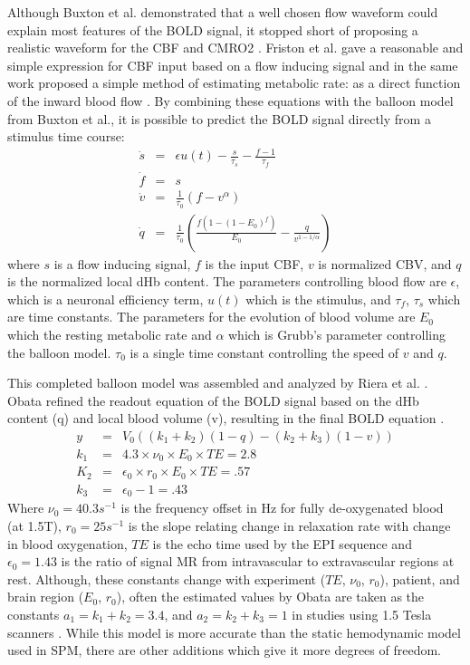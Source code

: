 Although Buxton et al. demonstrated that a well chosen flow waveform could 
explain most features of the \ac{BOLD} signal, it stopped short of proposing a
realistic waveform for the \ac{CBF} and \ac{CMRO2} \cite{Buxton1998}. Friston et al. 
gave a reasonable and simple
expression for \ac{CBF} input based on a flow inducing signal
and in the same work proposed a simple method
of estimating metabolic rate: as a direct function of the inward blood flow \cite{Friston2000}.
By combining these equations with the balloon model from Buxton et al.,
it is possible to predict the \ac{BOLD} signal directly from a stimulus time course:
\begin{eqnarray}
\dot{s} &=& \epsilon u(t) - \frac{s}{\tau_s} - \frac{f - 1}{\tau_f} \\
\dot{f} &=& s\\
\dot{v} &=& \frac{1}{\tau_0}(f - v^\alpha)\\
\dot{q} &=& \frac{1}{\tau_0}(\frac{f(1-(1-E_0)^f)}{E_0} - \frac{q}{v^{1-1/\alpha}})
\label{eq:bold}
\end{eqnarray}
where $s$ is a flow inducing signal, $f$ is the input \ac{CBF},
$v$ is normalized \ac{CBV}, and $q$ is the normalized
local \ac{dHb} content. The 
parameters controlling blood flow are $\epsilon$, which is a neuronal 
efficiency term, $u(t)$ which is the stimulus, and $\tau_f$, $\tau_s$ 
which are time constants. The parameters for the evolution of blood 
volume are $E_0$ which the resting metabolic
rate and $\alpha$ which is Grubb's parameter controlling the balloon model. 
$\tau_0$ is a single time constant controlling the speed of $v$ and $q$.

This completed balloon model was assembled and analyzed
by Riera et al. \cite{Riera2003}. Obata refined the readout equation 
of the \ac{BOLD} signal based on the
\ac{dHb} content (q) and local blood volume (v), resulting in the
final \ac{BOLD} equation \cite{Obata2004}.
\begin{eqnarray}
y   &=& V_0((k_1 + k_2)(1-q) - (k_2 + k_3)(1-v))\\
k_1 &=& 4.3 \times \nu_0 \times E_0 \times TE = 2.8\\
K_2 &=& \epsilon_0 \times r_0 \times E_0 \times TE = .57\\
k_3 &=& \epsilon_0 - 1 = .43
\label{eq:boldout}
\end{eqnarray}
Where $\nu_0 = 40.3 s^{-1}$  is the frequency offset in Hz for fully
de-oxygenated blood (at 1.5T), $r_0 = 25 s^{-1}$  is the slope relating
change in relaxation rate with change in blood oxygenation, $TE$ is the
echo time used by the \ac{EPI} sequence and $\epsilon_0 = 1.43$ is the 
ratio of signal \ac{MR} from intravascular to extravascular regions at rest. Although,
these constants change with experiment ($TE$, $\nu_0$, $r_0$),
patient, and brain 
region ($E_0$, $r_0$), often the estimated values by Obata are 
taken as the constants $a_1 = k_1 + k_2 = 3.4$, and $a_2 = k_2+k_3 = 1$ in 
studies using 1.5 Tesla scanners \cite{Obata2004}.
While this model is more accurate than the static hemodynamic model used in \ac{SPM},
there are other additions which give it more degrees of freedom. 

